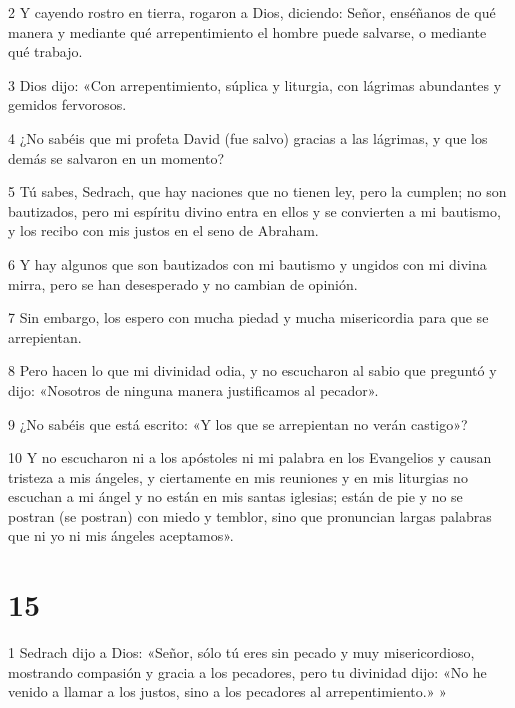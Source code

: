 \par 2 Y cayendo rostro en tierra, rogaron a Dios, diciendo: Señor, enséñanos de qué manera y mediante qué arrepentimiento el hombre puede salvarse, o mediante qué trabajo.

\par 3 Dios dijo: «Con arrepentimiento, súplica y liturgia, con lágrimas abundantes y gemidos fervorosos.

\par 4 ¿No sabéis que mi profeta David (fue salvo) gracias a las lágrimas, y que los demás se salvaron en un momento?

\par 5 Tú sabes, Sedrach, que hay naciones que no tienen ley, pero la cumplen; no son bautizados, pero mi espíritu divino entra en ellos y se convierten a mi bautismo, y los recibo con mis justos en el seno de Abraham.

\par 6 Y hay algunos que son bautizados con mi bautismo y ungidos con mi divina mirra, pero se han desesperado y no cambian de opinión.

\par 7 Sin embargo, los espero con mucha piedad y mucha misericordia para que se arrepientan.

\par 8 Pero hacen lo que mi divinidad odia, y no escucharon al sabio que preguntó y dijo: «Nosotros de ninguna manera justificamos al pecador».

\par 9 ¿No sabéis que está escrito: «Y los que se arrepientan no verán castigo»?

\par 10 Y no escucharon ni a los apóstoles ni mi palabra en los Evangelios y causan tristeza a mis ángeles, y ciertamente en mis reuniones y en mis liturgias no escuchan a mi ángel y no están en mis santas iglesias; están de pie y no se postran (se postran) con miedo y temblor, sino que pronuncian largas palabras que ni yo ni mis ángeles aceptamos».

\chapter{15}

\par 1 Sedrach dijo a Dios: «Señor, sólo tú eres sin pecado y muy misericordioso, mostrando compasión y gracia a los pecadores, pero tu divinidad dijo: «No he venido a llamar a los justos, sino a los pecadores al arrepentimiento.» »


